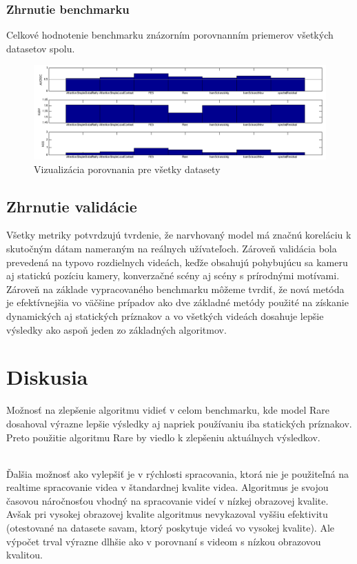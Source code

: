 \subsubsection{Zhrnutie benchmarku}
Celkové hodnotenie benchmarku znázorním porovnanním priemerov všetkých datasetov spolu.

\begin{figure}[H]
  \includegraphics[width=15cm]{pics/benchmark.png}
  \caption{Vizualizácia porovnania pre všetky datasety}
\end{figure}

\subsection{Zhrnutie validácie}
Všetky metriky potvrdzujú tvrdenie, že narvhovaný model má značnú koreláciu k skutočným dátam nameraným na reálnych užívateľoch.
Zároveň validácia bola prevedená na typovo rozdielnych videách, keďže obsahujú pohybujúcu sa kameru aj statickú pozíciu kamery, konverzačné scény aj scény s prírodnými motívami.
Zároveň na základe vypracovaného benchmarku môžeme tvrdiť, že nová metóda je efektívnejšia vo väčšine prípadov ako dve základné metódy použité na získanie dynamických aj statických príznakov a vo všetkých videách dosahuje lepšie výsledky ako aspoň jeden zo základných algoritmov.

\section{Diskusia}
\label{ssec:diskusia}
Možnosť na zlepšenie algoritmu vidieť v celom benchmarku, kde model Rare\cite{rare-1} dosahoval výrazne lepšie výsledky aj napriek používaniu iba statických príznakov.
Preto použitie algoritmu Rare\cite{rare-1} by viedlo k zlepšeniu aktuálnych výsledkov.

\\

Ďalšia možnosť ako vylepšiť je v rýchlosti spracovania, ktorá nie je použiteľná na realtime spracovanie videa v štandardnej kvalite videa.
Algoritmus je svojou časovou náročnosťou vhodný na spracovanie videí v nízkej obrazovej kvalite.
Avšak pri vysokej obrazovej kvalite algoritmus nevykazoval vyššiu efektivitu (otestované na datasete savam\cite{savam}, ktorý poskytuje videá vo vysokej kvalite).
Ale výpočet trval výrazne dlhšie ako v porovnaní s videom s nízkou obrazovou kvalitou.

